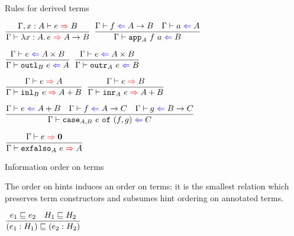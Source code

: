 \documentclass{beamer}
\begin{document}
\begin{frame}{Rules for derived terms}

\begin{center}
  $\infrule{\fullinfer{\extend{\Gamma}{x}{A}}{e}{B}}{\infer{\ifun{x}{A}{e}}{\Fun{A}{B}}}$ \quad
  $\infrule{\check{f}{\Fun{A}{B}} \quad \check{a}{A}}{\check{\iapp{A}{f}{a}}{B}}$

  \vspace{2em}

  $\infrule{\check{e}{\Prod{A}{B}}}{\check{\ioutl{B}{e}}{A}}$ \enspace
  $\infrule{\check{e}{\Prod{A}{B}}}{\check{\ioutr{A}{e}}{B}}$

  \vspace{2em}

  $\infrule{\infer{e}{A}}{\infer{\iinl{B}{e}}{\Sum{A}{B}}}$ \quad
  $\infrule{\infer{e}{B}}{\infer{\iinr{A}{e}}{\Sum{A}{B}}}$

  \vspace{2em}

  $\infrule{\check{e}{\Sum{A}{B}} \quad \check{f}{\Fun{A}{C}} \quad \check{g}{\Fun{B}{C}}}{\check{\icase{A}{B}{e}{f}{g}}{C}}$

  \vspace{2em}

  $\infrule{\infer{e}{\Empty}}{\infer{\iexfalso{A}{e}}{A}}$
\end{center}

\end{frame}

\newcommand{\fulltermorder}[3]{#1 \vdash #2 \sqsubseteq #3}
\newcommand{\termorder}[2]{#1 \sqsubseteq #2}

\begin{frame}{Information order on terms}

The order on hints induces an order on terms: it is the smallest relation which preserves term constructors and subsumes hint ordering on annotated terms.

\vspace{2em}

\begin{center}
  $\infrule{\termorder{e_1}{e_2} \quad \hintorder{H_1}{H_2}}{\termorder{\annot{e_1}{H_1}}{\annot{e_2}{H_2}}}$
\end{center}

\end{frame}
\end{document}
